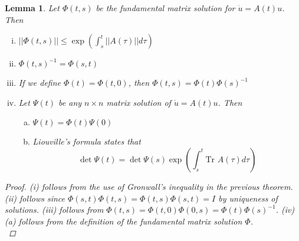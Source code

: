 \documentclass{article}
\newtheorem{lemma}[theorem]{Lemma}
\begin{document}
\begin{lemma}
Let $\Phi(t, s)$ be the fundamental matrix solution for $\dot{u} = A(t) u$. Then
\begin{enumerate}[(i)]
\item $||\Phi(t,s)|| \leq \exp\left( \int_s^t ||A(\tau)|| d\tau \right)$
\item $\Phi(t,s)^{-1} = \Phi(s,t)$ \\
\item If we define $\Phi(t) = \Phi(t, 0)$, then $\Phi(t,s) = \Phi(t)\Phi(s)^{-1}$
\item Let $\Psi(t)$ be any $n\times n$ matrix solution of $\dot{u} = A(t) u$. Then 
	\begin{enumerate}[(a)]
	\item $\Psi(t) = \Phi(t) \Psi(0)$
	\item Liouville's formula states that
	\begin{equation}
	\det \Psi(t) = \det \Psi(s) \exp\left( \int_s^t \text{Tr }A(\tau) d \tau \right)
	\end{equation}
	\end{enumerate}
\end{enumerate}
\begin{proof}
(i) follows from the use of Gronwall's inequality in the previous theorem. (ii) follows since $\Phi(s,t)\Phi(t,s) = \Phi(t,s)\Phi(s,t) = I$ by uniqueness of solutions. (iii) follows from $\Phi(t,s) = \Phi(t,0)\Phi(0,s) = \Phi(t)\Phi(s)^{-1}$. (iv)(a) follows from the definition of the fundamental matrix solution $\Phi$.\\


\end{proof}
\end{lemma}
\end{document}
